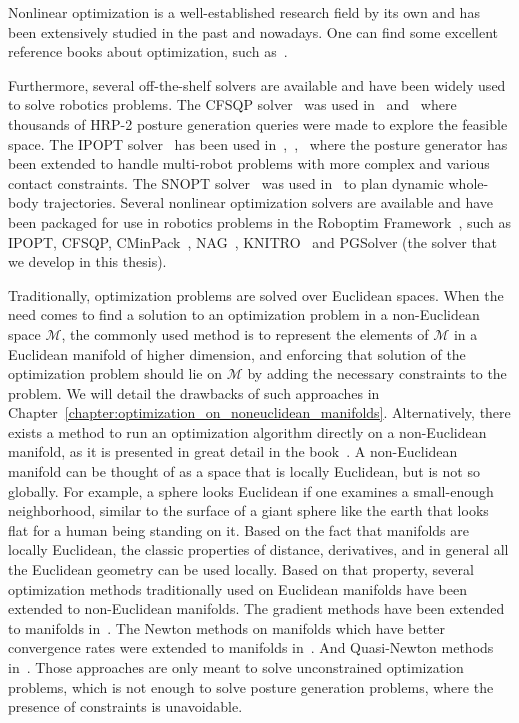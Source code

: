 Nonlinear optimization is a well-established research field by its own and has been extensively studied in the past and nowadays.
One can find some excellent reference books about optimization, such as~\cite{nocedal:book:2006, bonnans:book:2003, boyd2004convex}.

Furthermore, several off-the-shelf solvers are available and have been widely used to solve robotics problems.
The CFSQP solver~\cite{cfsqp:manual} was used in~\cite{escande:iros:2009} and~\cite{escande:ras:2013} where thousands of HRP-2 posture generation queries were made to explore the feasible space.
The IPOPT solver~\cite{wachter:mathprog:2006} has been used in~\cite{vaillant:humanoids:2014},~\cite{vaillant:autonomousrobots:2016},~\cite{bouyarmane:ar:2012} where the posture generator has been extended to handle multi-robot problems with more complex and various contact constraints.
The SNOPT solver~\cite{gill2005snopt} was used in~\cite{dai2014whole} to plan dynamic whole-body trajectories.
Several nonlinear optimization solvers are available and have been packaged for use in robotics problems in the Roboptim Framework~\cite{moulard:jsme:2013}, such as IPOPT, CFSQP, CMinPack~\cite{cminpack}, NAG~\cite{nag}, KNITRO~\cite{knitro} and PGSolver (the solver that we develop in this thesis).

Traditionally, optimization problems are solved over Euclidean spaces.
When the need comes to find a solution to an optimization problem in a non-Euclidean space $\mathcal{M}$, the commonly used method is to represent the elements of $\mathcal{M}$ in a Euclidean manifold of higher dimension, and enforcing that solution of the optimization problem should lie on $\mathcal{M}$ by adding the necessary constraints to the problem.
We will detail the drawbacks of such approaches in Chapter~\ref{chapter:optimization_on_noneuclidean_manifolds}.
Alternatively, there exists a method to run an optimization algorithm directly on a non-Euclidean manifold, as it is presented in great detail in the book~\cite{absil:book:2008}.
A non-Euclidean manifold can be thought of as a space that is locally Euclidean, but is not so globally.
For example, a sphere looks Euclidean if one examines a small-enough neighborhood, similar to the surface of a giant sphere like the earth that looks flat for a human being standing on it.
Based on the fact that manifolds are locally Euclidean, the classic properties of distance, derivatives, and in general all the Euclidean geometry can be used locally.
Based on that property, several optimization methods traditionally used on Euclidean manifolds have been extended to non-Euclidean manifolds.
The gradient methods have been extended to manifolds in~\cite{luenberger1972gradient, gabay1982minimizing}.
The Newton methods on manifolds which have better convergence rates were extended to manifolds in~\cite{gabay1982minimizing, stuart1998dynamical, smith2013geometric}.
And Quasi-Newton methods in~\cite{gabay1982minimizing}.
Those approaches are only meant to solve unconstrained optimization problems, which is not enough to solve posture generation problems, where the presence of constraints is unavoidable.


